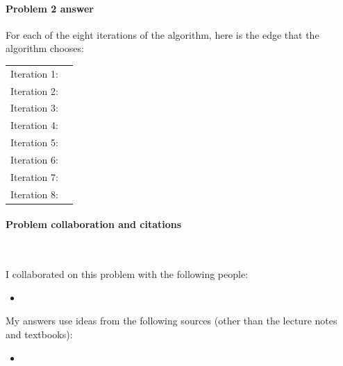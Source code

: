 \paragraph{Problem 2 answer}


For each of the eight iterations of the algorithm, here is the edge that the algorithm chooses: \smallskip


\begin{tabular}{rl}

  Iteration 1:
  & \BLUE{\(
    \REPLACEME
    \)}

  \\

  Iteration 2:
  & \BLUE{\(
    \REPLACEME
    \)}

  \\

  Iteration 3:
  & \BLUE{\(
    \REPLACEME
    \)}

  \\

    Iteration 4:
  & \BLUE{\(
    \REPLACEME
    \)}

  \\

    Iteration 5:
  & \BLUE{\(
    \REPLACEME
    \)}

  \\

    Iteration 6:
  & \BLUE{\(
    \REPLACEME
    \)}

  \\

    Iteration 7:
  & \BLUE{\(
    \REPLACEME
    \)}

  \\

    Iteration 8:
  & \BLUE{\(
    \REPLACEME
    \)}

\end{tabular}


\vfill

\paragraph{Problem  collaboration and citations}~

I collaborated on this problem with the following people:
\begin{blue}
  \begin{itemize}
  \item \REPLACEME                    %
  \end{itemize}
\end{blue}

My answers use ideas from the following sources (other than the lecture notes and textbooks): 
\begin{blue}
  \begin{itemize}
  \item \REPLACEME                    %
  \end{itemize}
\end{blue}



